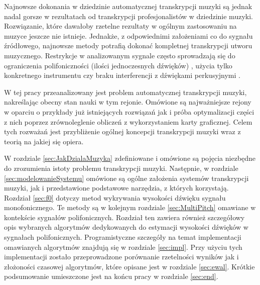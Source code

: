 \documentclass[12pt,a4paper,twoside]{mwart}
\begin{document}
Najnowsze dokonania w dziedzinie automatycznej transkrypcji muzyki są jednak nadal gorsze w rezultatach od transkrypcji profesjonalistów w dziedzinie muzyki. Rozwiązanie, które dawałoby rzetelne rezultaty w ogólnym zastosowaniu na muzyce jeszcze nie istnieje. Jednakże, z odpowiednimi założeniami co do sygnału źródłowego, najnowsze metody potrafią dokonać kompletnej transkrypcji utworu muzycznego. Restrykcje w analizowanym sygnale często sprowadzają się do ograniczenia polifoniczności (ilości jednoczesnych dźwięków) \cite{Transcription:BayesianHarmonicModels}, użycia tylko konkretnego instrumentu \cite{Transcription:Hawthorne:OnsetsAndFrames} czy braku interferencji z dźwiękami perkusyjnymi \cite{Transcription:Kameoka:HarmonicSeparation}.

W tej pracy przeanalizowany jest problem automatycznej transkrypcji muzyki, nakreślając obecny stan nauki w tym rejonie. Omówione są najważniejsze rejony w oparciu o przykłady już istniejących rozwiązań jak i próba optymalizacji części z nich poprzez zrównoleglenie obliczeń z wykorzystaniem karty graficznej. Celem tych rozważań jest przybliżenie ogólnej koncepcji transkrypcji muzyki wraz z teorią na jakiej się opiera.

W rozdziale \ref{sec:JakDzialaMuzyka} zdefiniowane i omówione są pojęcia niezbędne do zrozumienia istoty problemu transkrypcji muzyki. Następnie, w rozdziale \ref{sec:modelowanieSystemu} omówione są ogólne założenia systemów transkrypcji muzyki, jak i przedstawione podstawowe narzędzia, z których korzystają. Rozdział \ref{sec:f0} dotyczy metod wykrywania wysokości dźwięku sygnału monofonicznego. Te metody są w kolejnym rozdziale \ref{sec:MultiPitch} omawiane w kontekście sygnałów polifonicznych. Rozdział ten zawiera również szczegółowy opis wybranych algorytmów dedykowanych do estymacji wysokości dźwięków w sygnałach polifonicznych. Programistyczne szczegóły na temat implementacji omawianych algorytmów znajdują się w rozdziale \ref{sec:impl}. Przy użyciu tych implementacji zostało przeprowadzone porównanie rzetelności wyników jak i złożoności czasowej algorytmów, które opisane jest w rozdziale \ref{sec:ewal}. Krótkie podsumowanie umieszczone jest na końcu pracy w rozdziale \ref{sec:end}. 

\newpage
\setcounter{secnumdepth}{4}
\end{document}
